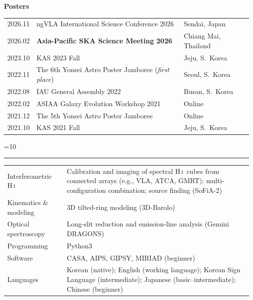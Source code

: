 \documentclass[12pt,letterpaper]{article}
\newcommand{\HI}{H\,\textsc{i}}
\newcommand{\cvneedspace}[1]{%
  \dimen0=#1\relax
  \ifdim\pagegoal=\maxdimen\else
    \ifdim\dimen0>\dimexpr\pagegoal-\pagetotal\relax\newpage\fi
  \fi}
\newcommand{\cvsectionspace}{10\baselineskip}
\newcommand{\cvsection}[2][]{%
  \cvneedspace{\cvsectionspace}%
  \vspace{1.9ex}%
  \noindent{\color{darkgreen}\fontsize{13}{15.6}\selectfont\bfseries
    \hspace*{0.45em}\raisebox{0.05em}{\rotatebox[origin=c]{45}{\rule{0.5em}{0.5em}}}\hspace{0.3em}
    \textls[80]{\MakeUppercase{#2}}%
    \hfill{\normalfont\normalsize\strut #1}}\par\vspace{0.5ex}%
  {\color{darkgreen}\hrule height 1pt}\par\vspace{1.1ex}%
  \nopagebreak}
\newcommand{\cvsubsection}[1]{%
  \vspace{0.6ex}\noindent\hspace*{0.6em}%
  {\color{darkgreen}\raisebox{0.1em}{\rule{0.35em}{0.35em}}\hspace{0.5em}\textbf{#1}}%
  \par\vspace{0.6ex}\nopagebreak}
\begin{document}
\cvsubsection{Posters}
\vspace{1mm}
{\normalsize
\begin{longtable}{@{}L{0.10\textwidth}L{0.58\textwidth}L{0.26\textwidth}@{}}
  2026.11 & ngVLA International Science Conference 2026 & Sendai, Japan \\
  2026.02 & \textbf{Asia-Pacific SKA Science Meeting 2026} & Chiang Mai, Thailand \\
  2023.10 & KAS 2023 Fall & Jeju, S.\ Korea \\
  2022.11 & The 6th Yonsei Astro Poster Jamboree (\emph{first place}) & Seoul, S.\ Korea \\
  2022.08 & IAU General Assembly 2022 & Busan, S.\ Korea \\
  2022.02 & ASIAA Galaxy Evolution Workshop 2021 & Online \\
  2021.12 & The 5th Yonsei Astro Poster Jamboree & Online \\
  2021.10 & KAS 2021 Fall & Jeju, S.\ Korea \\
\end{longtable}}

\cvsection{Research Skills}
{\normalsize
\begin{longtable}{@{}L{0.22\textwidth}L{0.75\textwidth}@{}}
  Interferometric \HI{} & Calibration and imaging of spectral \HI\ cubes from connected arrays (e.g., VLA, ATCA, GMRT);
    multi-configuration combination; source finding (SoFiA-2) \\
  Kinematics \& modeling & 3D tilted-ring modeling (3D-Barolo) \\
  Optical spectroscopy & Long-slit reduction and emission-line analysis (Gemini DRAGONS) \\
  Programming & Python3 \\
  Software & CASA, AIPS, GIPSY, MIRIAD (beginner) \\
  Languages & Korean (native); English (working language); Korean Sign Language (intermediate); Japanese (basic--intermediate); Chinese (beginner) \\
\end{longtable}}
\end{document}
